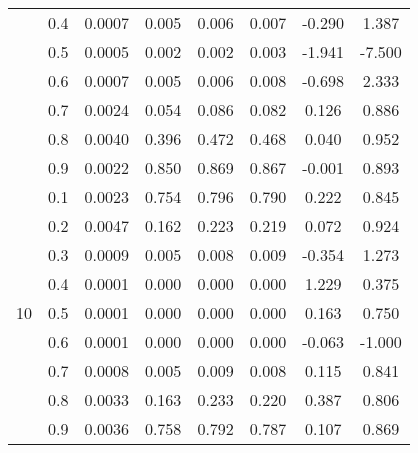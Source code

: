 \documentclass[11pt,a4paper]{report}
\begin{document}
\begin{longtable}{ | c | c || c | c | c | c | c | c | }
 & 0.4 & 0.0007 & 0.005 & 0.006 & 0.007 & -0.290 & 1.387 \\
 & 0.5 & 0.0005 & 0.002 & 0.002 & 0.003 & -1.941 & -7.500 \\
 & 0.6 & 0.0007 & 0.005 & 0.006 & 0.008 & -0.698 & 2.333 \\
 & 0.7 & 0.0024 & 0.054 & 0.086 & 0.082 & 0.126 & 0.886 \\
 & 0.8 & 0.0040 & 0.396 & 0.472 & 0.468 & 0.040 & 0.952 \\
 & 0.9 & 0.0022 & 0.850 & 0.869 & 0.867 & -0.001 & 0.893 \\
 \hline
\multirow{9}{*}{10} & 0.1 & 0.0023 & 0.754 & 0.796 & 0.790 & 0.222 & 0.845 \\
 & 0.2 & 0.0047 & 0.162 & 0.223 & 0.219 & 0.072 & 0.924 \\
 & 0.3 & 0.0009 & 0.005 & 0.008 & 0.009 & -0.354 & 1.273 \\
 & 0.4 & 0.0001 & 0.000 & 0.000 & 0.000 & 1.229 & 0.375 \\
 & 0.5 & 0.0001 & 0.000 & 0.000 & 0.000 & 0.163 & 0.750 \\
 & 0.6 & 0.0001 & 0.000 & 0.000 & 0.000 & -0.063 & -1.000 \\
 & 0.7 & 0.0008 & 0.005 & 0.009 & 0.008 & 0.115 & 0.841 \\
 & 0.8 & 0.0033 & 0.163 & 0.233 & 0.220 & 0.387 & 0.806 \\
 & 0.9 & 0.0036 & 0.758 & 0.792 & 0.787 & 0.107 & 0.869 \\
 \hline
\hline
\end{longtable}
\end{document}
